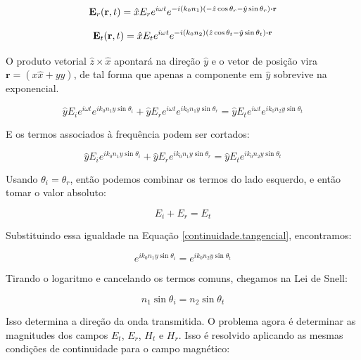 \documentclass[12pt,a4paper]{report}
\begin{document}
\begin{equation*}
    \textbf{E}_r(\textbf{r},t)=\hat{x}E_re^{i\omega t}e^{-i(k_0n_1)(-\hat{z}\cos\theta_r-\hat{y}\sin\theta_r)\vdot\textbf{r}}
\end{equation*}

\begin{equation*}
    \textbf{E}_t(\textbf{r},t)=\hat{x}E_te^{i\omega t}e^{-i(k_0n_2)(\hat{z}\cos\theta_t-\hat{y}\sin\theta_t)\vdot\textbf{r}}
\end{equation*}

 O produto vetorial $\hat{z}\times\hat{x}$ apontará na direção $\hat{y}$ e o vetor de posição vira $\textbf{r}=(x\hat{x}+y\hat{y})$, de tal forma que apenas a componente em $\hat{y}$ sobrevive na exponencial.
 
 \begin{equation*}
    \hat{y}E_ie^{i\omega t}e^{ik_0n_1y\sin\theta_i}+
    \hat{y}E_re^{i\omega t}e^{ik_0n_1y\sin\theta_r}
    =
    \hat{y}E_te^{i\omega t}e^{ik_0n_2y\sin\theta_t}
\end{equation*}

E os termos associados à frequência podem ser cortados:

\begin{equation}
    \hat{y}E_ie^{ik_0n_1y\sin\theta_i}+
    \hat{y}E_re^{ik_0n_1y\sin\theta_r}
    =
    \hat{y}E_te^{ik_0n_2y\sin\theta_t}
    \label{continuidade.tangencial}
\end{equation}

Usando $\theta_i=\theta_r$, então podemos combinar os termos do lado esquerdo, e então tomar o valor absoluto:

 \begin{equation}
   E_i+E_r=E_t
   \label{conservacao.de.campo}
\end{equation}

Substituindo essa igualdade na Equação \ref{continuidade.tangencial}, encontramos:

\begin{equation}
    e^{ik_0n_1y\sin\theta_i}
    =
    e^{ik_0n_2y\sin\theta_t}
\end{equation}

Tirando o logaritmo e cancelando os termos comuns, chegamos na Lei de Snell:

\begin{equation}
    \boxed{n_1\sin\theta_i=n_2\sin\theta_t}
\end{equation}

Isso determina a direção da onda transmitida. O problema agora é determinar as magnitudes dos campos $E_t$, $E_r$, $H_t$ e $H_r$. Isso é resolvido aplicando as mesmas condições de continuidade para o campo magnético:
\end{document}
